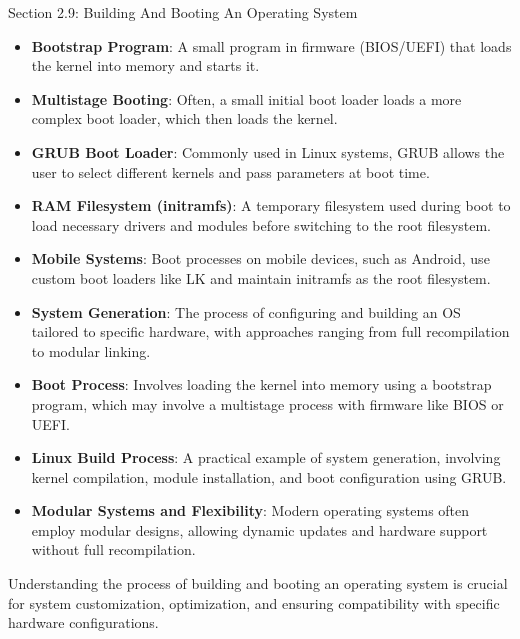 \begin{notes}{Section 2.9: Building And Booting An Operating System}
\begin{highlight}
    \begin{itemize}
        \item \textbf{Bootstrap Program}: A small program in firmware (BIOS/UEFI) that loads the kernel into memory and starts it.
        \item \textbf{Multistage Booting}: Often, a small initial boot loader loads a more complex boot loader, which then loads the kernel.
        \item \textbf{GRUB Boot Loader}: Commonly used in Linux systems, GRUB allows the user to select different kernels and pass parameters at boot time.
        \item \textbf{RAM Filesystem (initramfs)}: A temporary filesystem used during boot to load necessary drivers and modules before switching to the root filesystem.
        \item \textbf{Mobile Systems}: Boot processes on mobile devices, such as Android, use custom boot loaders like LK and maintain initramfs as the root filesystem.
    \end{itemize}
    
    \end{highlight}
    
    \begin{highlight}
    
    \begin{itemize}
        \item \textbf{System Generation}: The process of configuring and building an OS tailored to specific hardware, with approaches ranging from full recompilation to modular linking.
        \item \textbf{Boot Process}: Involves loading the kernel into memory using a bootstrap program, which may involve a multistage process with firmware like BIOS or UEFI.
        \item \textbf{Linux Build Process}: A practical example of system generation, involving kernel compilation, module installation, and boot configuration using GRUB.
        \item \textbf{Modular Systems and Flexibility}: Modern operating systems often employ modular designs, allowing dynamic updates and hardware support without full recompilation.
    \end{itemize}
    
    Understanding the process of building and booting an operating system is crucial for system customization, optimization, and ensuring compatibility with specific hardware configurations.
    
    \end{highlight}
\end{notes}

